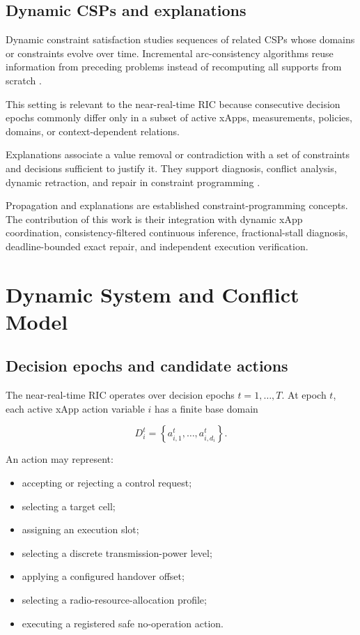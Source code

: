 \documentclass[pdflatex,sn-mathphys-num,iicol,oneside]{sn-jnl}
\begin{document}
\subsection{Dynamic CSPs and explanations}

Dynamic constraint satisfaction studies sequences of related CSPs
whose domains or constraints evolve over time. Incremental
arc-consistency algorithms reuse information from preceding problems
instead of recomputing all supports from scratch
\cite{bessiere1991dynamic}.

This setting is relevant to the near-real-time RIC because consecutive
decision epochs commonly differ only in a subset of active xApps,
measurements, policies, domains, or context-dependent relations.

Explanations associate a value removal or contradiction with a set of
constraints and decisions sufficient to justify it. They support
diagnosis, conflict analysis, dynamic retraction, and repair in
constraint programming \cite{gupta2021explanations}.

Propagation and explanations are established constraint-programming
concepts. The contribution of this work is their integration with
dynamic xApp coordination, consistency-filtered continuous inference,
fractional-stall diagnosis, deadline-bounded exact repair, and
independent execution verification.

\section{Dynamic System and Conflict Model}
\label{sec:model}

\subsection{Decision epochs and candidate actions}

The near-real-time RIC operates over decision epochs
$t=1,\ldots,T$. At epoch $t$, each active xApp action variable $i$
has a finite base domain

\begin{equation}
D_i^t
=
\left\{
a_{i,1}^t,\ldots,a_{i,d_i}^t
\right\}.
\end{equation}

An action may represent:

\begin{itemize}
    \item accepting or rejecting a control request;
    \item selecting a target cell;
    \item assigning an execution slot;
    \item selecting a discrete transmission-power level;
    \item applying a configured handover offset;
    \item selecting a radio-resource-allocation profile;
    \item executing a registered safe no-operation action.
\end{itemize}
\end{document}
